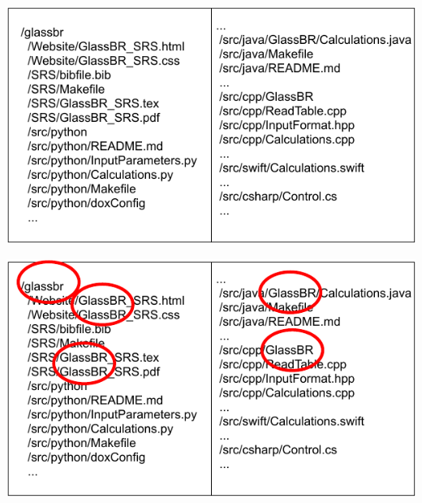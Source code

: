 \documentclass{beamer}
\begin{document}

\begin{frame}


\includegraphics[width=1.05\textwidth]{../figures/FoldersFiles.pdf}

\end{frame}


\begin{frame}


\includegraphics[width=1.05\textwidth]{../figures/FoldersFilesCircleGlassBR.pdf}

\end{frame}

\end{document}

